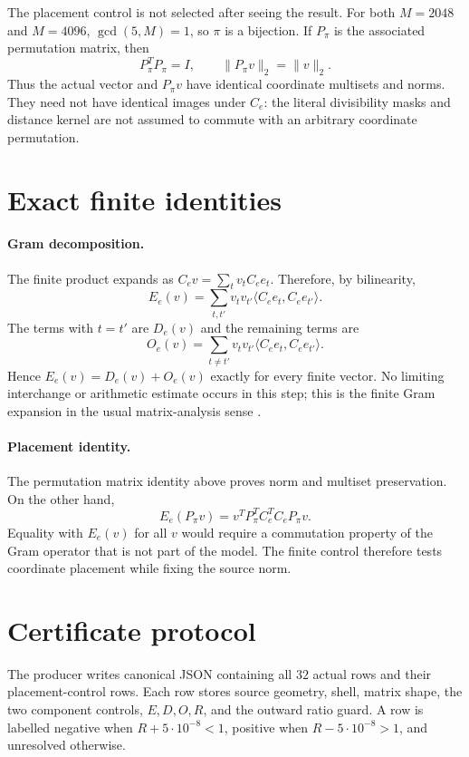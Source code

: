 \documentclass[10pt]{article}
\newcommand{\1}{\mathbf 1}
\begin{document}
The placement control is not selected after seeing the result.  For both
$M=2048$ and $M=4096$, $\gcd(5,M)=1$, so $\pi$ is a bijection.  If $P_\pi$ is
the associated permutation matrix, then
\[
 P_\pi^TP_\pi=I,\qquad \|P_\pi v\|_2=\|v\|_2.
\]
Thus the actual vector and $P_\pi v$ have identical coordinate multisets and
norms.  They need not have identical images under $C_e$: the literal
divisibility masks and distance kernel are not assumed to commute with an
arbitrary coordinate permutation.

\section{Exact finite identities}

\paragraph{Gram decomposition.}
The finite product expands as $C_ev=\sum_t v_tC_ee_t$.  Therefore, by
bilinearity,
\[
 E_e(v)=\sum_{t,t'}v_tv_{t'}
       \langle C_ee_t,C_ee_{t'}\rangle.
\]
The terms with $t=t'$ are $D_e(v)$ and the remaining terms are
\[
 O_e(v)=\sum_{t\ne t'}v_tv_{t'}
       \langle C_ee_t,C_ee_{t'}\rangle.
\]
Hence $E_e(v)=D_e(v)+O_e(v)$ exactly for every finite vector.  No limiting
interchange or arithmetic estimate occurs in this step; this is the finite
Gram expansion in the usual matrix-analysis sense \cite{horn2013matrix}.

\paragraph{Placement identity.}
The permutation matrix identity above proves norm and multiset preservation.
On the other hand,
\[
 E_e(P_\pi v)=v^TP_\pi^TC_e^TC_eP_\pi v.
\]
Equality with $E_e(v)$ for all $v$ would require a commutation property of the
Gram operator that is not part of the model.  The finite control therefore
tests coordinate placement while fixing the source norm.

\section{Certificate protocol}

The producer writes canonical JSON containing all $32$ actual rows and their
placement-control rows.  Each row stores source geometry, shell, matrix shape,
the two component controls, $E,D,O,R$, and the outward ratio guard.  A row is
labelled negative when $R+5\cdot10^{-8}<1$, positive when
$R-5\cdot10^{-8}>1$, and unresolved otherwise.
\end{document}
